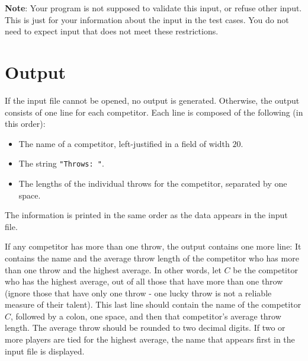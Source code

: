 \textbf{Note}: Your program is not supposed to validate this input, or refuse other input.
This is just for your information about the input in the test cases. 
You do not need to expect input that does not meet these restrictions.


\pagebreak
\section*{Output}
If the input file cannot be opened, no output is generated.
Otherwise, the output consists of one line for each competitor.
Each line is composed of the following (in this order):
\begin{itemize}
\item The name of a competitor, left-justified in a field of width $20$.
\item The string \texttt{"Throws: "}.
\item The lengths of the individual throws for the competitor, separated by one space.
\end{itemize}
The information is printed in the same order as the data appears in the input file.

If any competitor has more than one throw, the output contains one more line:
It contains the name and the average throw length
of the competitor who has more than one throw and the highest average.
In other words, let $C$ be the competitor who has the highest average,
out of all those that have more than one throw
(ignore those that have only one throw - one lucky throw is not a reliable measure of their talent).
This last line should contain the name of the competitor $C$,
followed by a colon, one space, and then that competitor's average throw length.
The average throw should be rounded to two decimal digits.
If two or more players are tied for the highest average,
the name that appears first in the input file is displayed.

